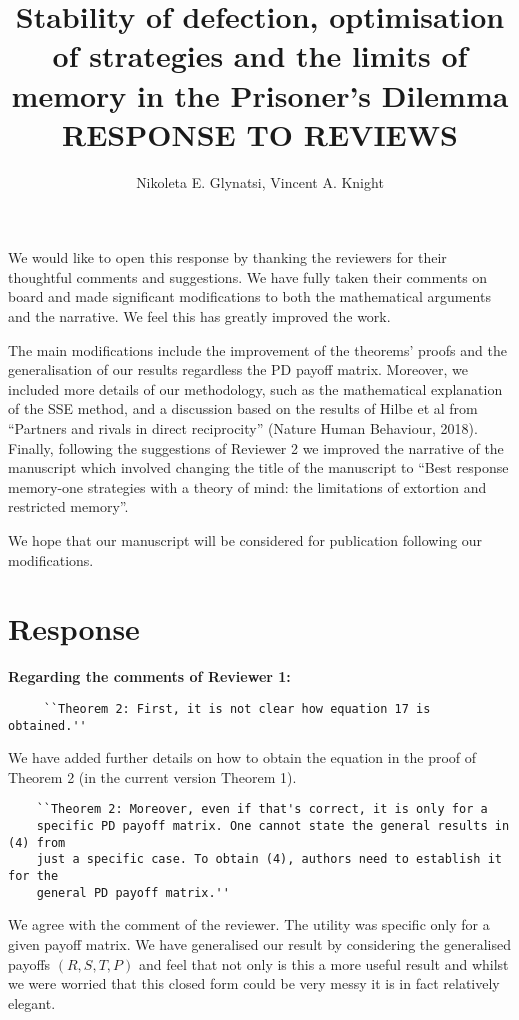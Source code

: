 \documentclass{article}
\title{Stability of defection, optimisation of strategies and the limits of
memory in the Prisoner's Dilemma RESPONSE TO REVIEWS}
\author{Nikoleta E. Glynatsi, Vincent A. Knight}
\begin{document}
\maketitle

We would like to open this response by thanking the reviewers for their
thoughtful comments and suggestions. We have fully taken their comments on board
and made significant modifications to both the mathematical arguments and the narrative. We feel this has greatly improved the work.

The main modifications include the improvement of the theorems' proofs and the
generalisation of our results regardless the PD payoff matrix. Moreover, we
included more details of our methodology, such as the mathematical explanation
of the SSE method, and a discussion based on the results of Hilbe et al from
``Partners and rivals in direct reciprocity'' (Nature Human Behaviour, 2018).
Finally, following the suggestions of Reviewer 2 we improved the narrative of
the manuscript which involved changing the title of the manuscript to 
``Best response memory-one strategies with a theory of mind: the limitations
of extortion and restricted memory''.

We hope that our manuscript will be considered for publication following our
modifications.

\section{Response}

\textbf{Regarding the comments of Reviewer 1:}

\begin{verbatim}
     ``Theorem 2: First, it is not clear how equation 17 is obtained.''
\end{verbatim}

We have added further details on how to obtain the equation in the proof of Theorem 2
(in the current version Theorem 1).

\begin{verbatim}
    ``Theorem 2: Moreover, even if that's correct, it is only for a
    specific PD payoff matrix. One cannot state the general results in (4) from
    just a specific case. To obtain (4), authors need to establish it for the
    general PD payoff matrix.''
\end{verbatim}

We agree with the comment of the reviewer. The utility was
specific only for a given payoff matrix. We have generalised our result by
considering the generalised payoffs \((R, S, T, P)\) and feel that not only is this a more useful 
result and whilst we were worried that this closed form could be very messy it is in fact relatively elegant.
\end{document}
